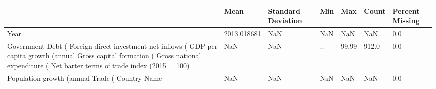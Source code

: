 \begin{tabular}{lllllll}
\toprule
{} &         Mean & Standard Deviation &    Min &    Max &  Count & Percent Missing \\
\midrule
Year                                             &  2013.018681 &                NaN &    NaN &    NaN &    NaN &             0.0 \\
Government Debt (%
Foreign direct investment net inflows (%
GDP per capita growth (annual %
Gross capital formation (%
Gross national expenditure (%
Net barter terms of trade index (2015 = 100)     &          NaN &                NaN &     .. &  99.99 &  912.0 &             0.0 \\
Population growth (annual %
Trade (%
Country Name                                     &          NaN &                NaN &    NaN &    NaN &    NaN &             0.0 \\
\bottomrule
\end{tabular}

